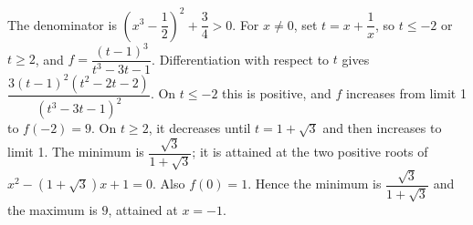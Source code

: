 The denominator is $(x^3 - \dfrac{1}{2})^2 + \dfrac{3}{4} > 0$. For $x\ne0$, set $t = x + \dfrac{1}{x}$, so $t\le-2$ or $t\ge2$, and $f = \dfrac{(t-1)^3}{t^3-3t-1}$. Differentiation with respect to $t$ gives $\dfrac{3 (t-1)^2 (t^2-2t-2)}{(t^3-3t-1)^2}$. On $t\le-2$ this is positive, and $f$ increases from limit 1 to $f(-2)=9$. On $t\ge2$, it decreases until $t=1+\sqrt3$ and then increases to limit 1. The minimum is $\dfrac{\sqrt{3}}{1+\sqrt3}$; it is attained at the two positive roots of $x^2-(1+\sqrt3)x+1=0$. Also $f(0)=1$. Hence the minimum is $\boxed{\dfrac{\sqrt{3}}{1+\sqrt3}}$ and the maximum is $\boxed9$, attained at $x=-1$.
